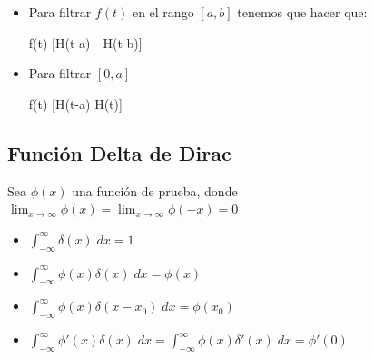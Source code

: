 \documentclass[12pt, fleqn]{report}                             %
\newenvironment{MultiLineEquation*}[1]                          %
        {\begin{equation*}\begin{alignedat}{#1}}                    %
        {\end{alignedat}\end{equation*}}                            %
\begin{document}
                \begin{itemize}
                    \item
                        Para filtrar $f(t)$ en el rango $[a,b]$
                        tenemos que hacer que:
                        \begin{MultiLineEquation*}{3}
                            f(t) [H(t-a) - H(t-b)]
                        \end{MultiLineEquation*}

                    \item
                        Para filtrar $[0,a]$
                        \begin{MultiLineEquation*}{3}
                            f(t) [H(t-a) H(t)]
                        \end{MultiLineEquation*}
                            
                            
                \end{itemize}



            \subsection{Función Delta de Dirac}

                Sea $\phi(x)$ una función de prueba, donde
                $\lim_{x \to \infty} \phi(x) = \lim_{x \to \infty} \phi(-x) = 0$

                \begin{itemize}
                    \item $\int_{-\infty}^\infty \delta(x) \; dx = 1$
                    \item $\int_{-\infty}^\infty \phi(x) \delta(x) \; dx = \phi(x)$
                    \item $\int_{-\infty}^\infty \phi(x) \delta(x-x_0) \; dx = \phi(x_0)$
                    \item $\int_{-\infty}^\infty \phi'(x) \delta(x)  \; dx =
                           \int_{-\infty}^\infty \phi(x)  \delta'(x) \; dx = \phi'(0)$
                \end{itemize}
                    

\end{document}
